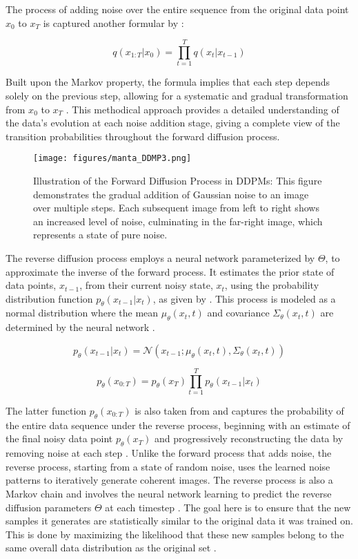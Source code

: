 The process of adding noise over the entire sequence from the original data point \( x_0 \) to \( x_T \) is captured another formular by \citeauthor{martinez2023understanding}:

\[q(x_{1:T} | x_0) = \prod_{t=1}^T q(x_t | x_{t-1}) \] 

Built upon the Markov property, the formula implies that each step depends solely on the previous step, allowing for a systematic and gradual transformation from \( x_0 \) to \( x_T \) \citep{martinez2023understanding}. This methodical approach provides a detailed understanding of the data's evolution at each noise addition stage, giving a complete view of the transition probabilities throughout the forward diffusion process.

\begin{figure}[ht]
\centering
  \texttt{[image: figures/manta\_DDMP3.png]}
  \caption{Illustration of the Forward Diffusion Process in DDPMs: This figure demonstrates the gradual addition of Gaussian noise to an image over multiple steps. Each subsequent image from left to right shows an increased level of noise, culminating in the far-right image, which represents a state of pure noise.}\label{fig:figureForwardProcess}
\end{figure}

The reverse diffusion process employs a neural network parameterized by \(\Theta\), to approximate the inverse of the forward process. It estimates the prior state of data points, \( x_{t-1} \), from their current noisy state, \( x_t \), using the probability distribution function \( p_\theta(x_{t-1} | x_t) \), as given by \citeauthor{martinez2023understanding}. This process is modeled as a normal distribution where the mean \( \mu_\theta(x_t, t) \) and covariance \( \Sigma_\theta(x_t, t) \) are determined by the neural network \citep{yangdiffusionSummary}.

\[
  p_\theta(x_{t-1} | x_t) = \mathcal{N}(x_{t-1}; \mu_\theta(x_t, t), \Sigma_\theta(x_t, t))
\] 

\[p_\theta(x_{0:T}) = p_\theta(x_{T}) \prod_{t=1}^T p_\theta(x_{t-1} | x_t) \]

The latter function \(p_\theta(x_{0:T})\) is also taken from \citeauthor{martinez2023understanding} and captures the probability of the entire data sequence under the reverse process, beginning with an estimate of the final noisy data point \(p_\theta(x_{T})\) and progressively reconstructing the data by removing noise at each step \citep{hoDDPMs,martinez2023understanding}. Unlike the forward process that adds noise, the reverse process, starting from a state of random noise, uses the learned noise patterns to iteratively generate coherent images. The reverse process is also a Markov chain and involves the neural network learning to predict the reverse diffusion parameters \(\Theta\) at each timestep \citep{yangdiffusionSummary}. The goal here is to ensure that the new samples it generates are statistically similar to the original data it was trained on. This is done by maximizing the likelihood that these new samples belong to the same overall data distribution as the original set \citep{yangdiffusionSummary}.

